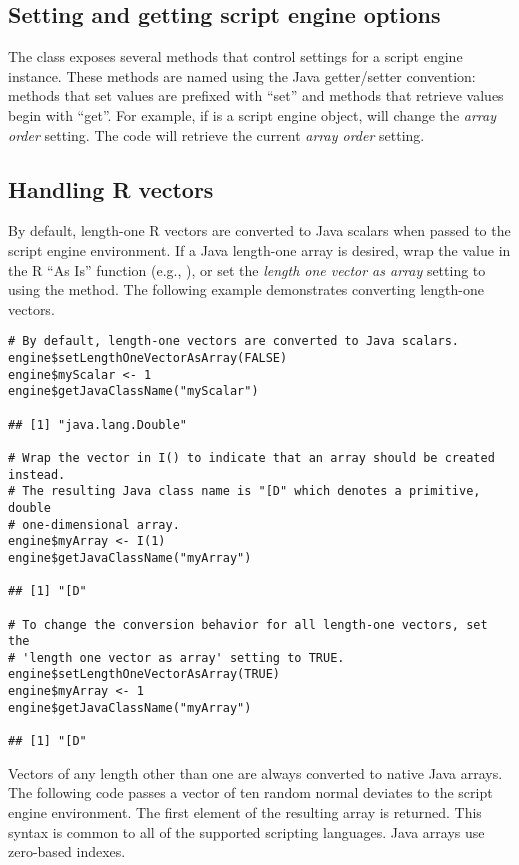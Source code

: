 \subsection{Setting and getting script engine options}

The   class exposes several methods that control settings for a script engine instance. These methods are named using the Java getter/setter convention: methods that set values are prefixed with ``set'' and methods that retrieve values begin with ``get''. For example, if  is a script engine object,  will change the \textit{array order} setting. The code  will retrieve the current \textit{array order} setting.

\hypertarget{handlingrvectors}{\subsection{Handling R vectors}}

By default, length-one R vectors are converted to Java scalars when passed to the script engine environment. If a Java length-one array is desired, wrap the value in the R ``As Is'' function (e.g., ), or set the \textit{length one vector as array} setting to  using the  method. The following example demonstrates converting length-one vectors.

\begin{verbatim}
# By default, length-one vectors are converted to Java scalars.
engine$setLengthOneVectorAsArray(FALSE)
engine$myScalar <- 1
engine$getJavaClassName("myScalar")

## [1] "java.lang.Double"

# Wrap the vector in I() to indicate that an array should be created instead.
# The resulting Java class name is "[D" which denotes a primitive, double 
# one-dimensional array.
engine$myArray <- I(1)
engine$getJavaClassName("myArray")

## [1] "[D"

# To change the conversion behavior for all length-one vectors, set the 
# 'length one vector as array' setting to TRUE.
engine$setLengthOneVectorAsArray(TRUE)
engine$myArray <- 1
engine$getJavaClassName("myArray")

## [1] "[D"
\end{verbatim}

Vectors of any length other than one are always converted to native Java arrays. The following code passes a vector of ten random normal deviates to the script engine environment. The first element of the resulting array is returned. This syntax is common to all of the supported scripting languages.  Java arrays use zero-based indexes.


